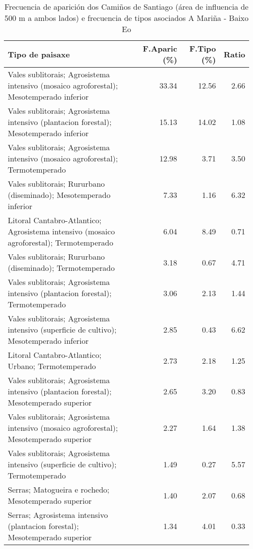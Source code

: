 \begin{table}[p]
\centering
\caption{Frecuencia de aparición dos Camiños de Santiago (área de influencia de 500 m a ambos lados) e frecuencia de tipos asociados A Mariña - Baixo Eo} 
\label{vcamino2}
\begin{tabular}{lrrr}
  \hline
Tipo de paisaxe & F.Aparic (\%) & F.Tipo (\%) & Ratio \\ 
  \hline
Vales sublitorais; Agrosistema intensivo (mosaico agroforestal); Mesotemperado inferior & 33.34 & 12.56 & 2.66 \\ 
  Vales sublitorais; Agrosistema intensivo (plantacion forestal); Mesotemperado inferior & 15.13 & 14.02 & 1.08 \\ 
  Vales sublitorais; Agrosistema intensivo (mosaico agroforestal); Termotemperado & 12.98 & 3.71 & 3.50 \\ 
  Vales sublitorais; Rururbano (diseminado); Mesotemperado inferior & 7.33 & 1.16 & 6.32 \\ 
  Litoral Cantabro-Atlantico; Agrosistema intensivo (mosaico agroforestal); Termotemperado & 6.04 & 8.49 & 0.71 \\ 
  Vales sublitorais; Rururbano (diseminado); Termotemperado & 3.18 & 0.67 & 4.71 \\ 
  Vales sublitorais; Agrosistema intensivo (plantacion forestal); Termotemperado & 3.06 & 2.13 & 1.44 \\ 
  Vales sublitorais; Agrosistema intensivo (superficie de cultivo); Mesotemperado inferior & 2.85 & 0.43 & 6.62 \\ 
  Litoral Cantabro-Atlantico; Urbano; Termotemperado & 2.73 & 2.18 & 1.25 \\ 
  Vales sublitorais; Agrosistema intensivo (plantacion forestal); Mesotemperado superior & 2.65 & 3.20 & 0.83 \\ 
  Vales sublitorais; Agrosistema intensivo (mosaico agroforestal); Mesotemperado superior & 2.27 & 1.64 & 1.38 \\ 
  Vales sublitorais; Agrosistema intensivo (superficie de cultivo); Termotemperado & 1.49 & 0.27 & 5.57 \\ 
  Serras; Matogueira e rochedo; Mesotemperado superior & 1.40 & 2.07 & 0.68 \\ 
  Serras; Agrosistema intensivo (plantacion forestal); Mesotemperado superior & 1.34 & 4.01 & 0.33 \\ 
   \hline
\end{tabular}
\end{table}

